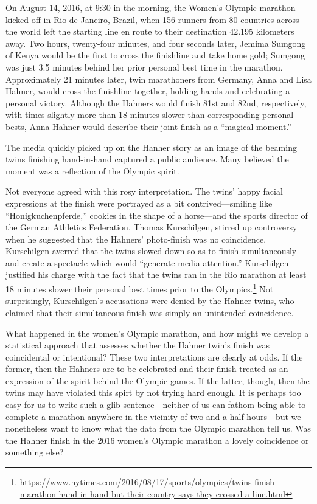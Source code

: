 \documentclass[12pt,titlepage]{article}
\begin{document}
On August 14, 2016, at 9:30 in the morning, the Women's Olympic
marathon kicked off in Rio de Janeiro, Brazil, when 156 runners from
80 countries across the world left the starting line en route to their
destination 42.195 kilometers away. Two hours, twenty-four minutes,
and four seconds later, Jemima Sumgong of Kenya would be the first to
cross the finishline and take home gold; Sumgong was just 3.5 minutes
behind her prior personal best time in the marathon. Approximately 21
minutes later, twin marathoners from Germany, Anna and Lisa Hahner,
would cross the finishline together, holding hands and celebrating a
personal victory. Although the Hahners would finish 81st and 82nd,
respectively, with times slightly more than 18 minutes slower than
corresponding personal bests, Anna Hahner would describe their joint
finish as a ``magical moment.''

The media quickly picked up on the Hanher story as an image of the
beaming twins finishing hand-in-hand captured a public audience. Many
believed the moment was a reflection of the Olympic spirit.


Not everyone agreed with this rosy interpretation. The twins' happy
facial expressions at the finish were portrayed as a bit
contrived---smiling like ``Honigkuchenpferde,'' cookies in the shape
of a horse---and the sports director of the German Athletics
Federation, Thomas Kurschilgen, stirred up controversy when he
suggested that the Hahners' photo-finish was no coincidence.
Kurschilgen averred that the twins slowed down so as to finish
simultaneously and create a spectacle which would ``generate media
attention.'' Kurschilgen justified his charge with the fact that the
twins ran in the Rio marathon at least 18 minutes slower their
personal best times prior to the
Olympics.\footnote{\url{https://www.nytimes.com/2016/08/17/sports/olympics/twins-finish-marathon-hand-in-hand-but-their-country-says-they-crossed-a-line.html}}
Not surprisingly, Kurschilgen's accusations were denied by the Hahner
twins, who claimed that their simultaneous finish was simply an
unintended coincidence.


What happened in the women's Olympic marathon, and how might we
develop a statistical approach that assesses whether the Hahner twin's
finish was coincidental or intentional?  These two interpretations are
clearly at odds. If the former, then the Hahners are to be celebrated
and their finish treated as an expression of the spirit behind the
Olympic games. If the latter, though, then the twins may have violated
this spirt by not trying hard enough. It is perhaps too easy for us to
write such a glib sentence---neither of us can fathom being able to
complete a marathon anywhere in the vicinity of two and a half
hours---but we nonetheless want to know what the data from the Olympic
marathon tell us.  Was the Hahner finish in the 2016 women's
Olympic marathon a lovely coincidence or something else?
\end{document}
